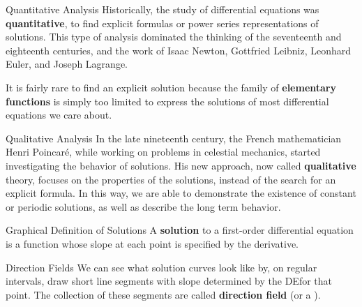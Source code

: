 \documentclass{beamer}
\begin{document}
\begin{frame}
\begin{block}{Quantitative Analysis}
Historically, the study of differential equations was \textbf{quantitative}, to find explicit formulas or power series representations of solutions. This type of analysis dominated the thinking of the seventeenth and eighteenth centuries, and the work of Isaac Newton, Gottfried Leibniz, Leonhard Euler, and Joseph Lagrange.\pause

\vspace{2mm}
It is fairly rare to find an explicit solution because the family of \textbf{elementary functions} is simply too limited to express the solutions of most differential equations we care about.
\end{block}\pause

\begin{block}{Qualitative Analysis}
In the late nineteenth century, the French mathematician Henri Poincar\'{e}, while working on problems in celestial mechanics, started investigating the behavior of solutions. His new approach, now called \textbf{qualitative} theory, focuses on the properties of the solutions, instead of the search for an explicit formula. In this way, we are able to demonstrate the existence of constant or periodic solutions, as well as describe the long term behavior.
\end{block}
\end{frame}

\begin{frame}
\begin{block}{Graphical Definition of Solutions}
A \textbf{solution} to a first-order differential equation is a function whose slope at each point is specified by the derivative.
\end{block}

\begin{block}{Direction Fields}
We can see what solution curves look like by, on regular intervals, draw short line segments with slope determined by the DE\@ for that point. The collection of these segments are called \textbf{direction field} (or a ).
\end{block}
\end{frame}
\end{document}
